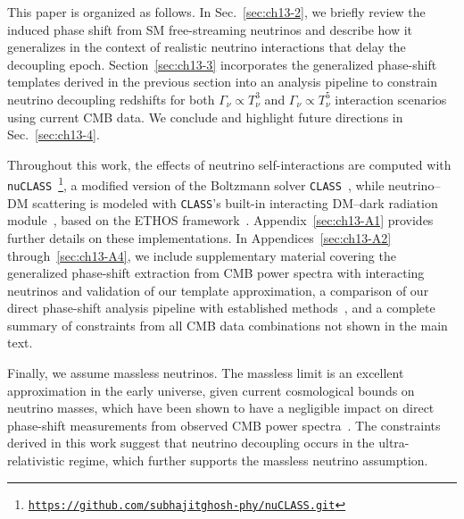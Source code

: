 This paper is organized as follows. In Sec.~\ref{sec:ch13-2}, we briefly review the induced phase shift from SM free-streaming neutrinos and describe how it generalizes in the context of realistic neutrino interactions that delay the decoupling epoch. Section~\ref{sec:ch13-3} incorporates the generalized phase-shift templates derived in the previous section into an analysis pipeline to constrain neutrino decoupling redshifts for both $\Gamma_\nu \propto T_\nu^3$ and $\Gamma_\nu \propto T_\nu^5$ interaction scenarios using current CMB data. We conclude and highlight future directions in Sec.~\ref{sec:ch13-4}.

Throughout this work, the effects of neutrino self-interactions are computed with \texttt{nuCLASS}~\cite{Libanore:2025ack}\footnote{\href{https://github.com/subhajitghosh-phy/nuCLASS.git}{\texttt{https://github.com/subhajitghosh-phy/nuCLASS.git}}}, a modified version of the Boltzmann solver \texttt{CLASS}~\cite{Blas:2011rf}, while neutrino--DM scattering is modeled with \texttt{CLASS}'s built-in interacting DM--dark radiation module~\cite{Archidiacono:2019wdp}, based on the ETHOS framework~\cite{Cyr-Racine:2015ihg}. Appendix~\ref{sec:ch13-A1} provides further details on these implementations. In Appendices~\ref{sec:ch13-A2} through~\ref{sec:ch13-A4}, we include supplementary material covering the generalized phase-shift extraction from CMB power spectra with interacting neutrinos and validation of our template approximation, a comparison of our direct phase-shift analysis pipeline with established methods~\cite{Follin:2015hya,Montefalcone:2025unv}, and a complete summary of constraints from all CMB data combinations not shown in the main text.

Finally, we assume massless neutrinos. The massless limit is an excellent approximation in the early universe, given current cosmological bounds on neutrino masses, which have been shown to have a negligible impact on direct phase-shift measurements from observed CMB power spectra~\cite{Montefalcone:2025unv}. The constraints derived in this work suggest that neutrino decoupling occurs in the ultra-relativistic regime, which further supports the massless neutrino assumption.

